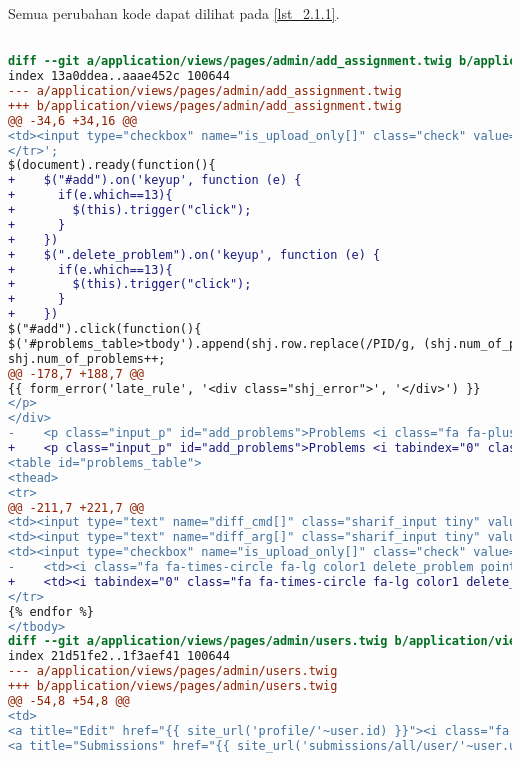 \begin{itemize}
	Semua perubahan kode dapat dilihat pada \ref{lst_2.1.1}.

\begin{lstlisting}[language=diff, caption=Perubahan untuk mematuhi kriteria 2.1.1, label=lst_2.1.1, basicstyle=\ttfamily, frame=single,
columns=fullflexible, keepspaces=true, breaklines=true]

diff --git a/application/views/pages/admin/add_assignment.twig b/application/views/pages/admin/add_assignment.twig
index 13a0ddea..aaae452c 100644
--- a/application/views/pages/admin/add_assignment.twig
+++ b/application/views/pages/admin/add_assignment.twig
@@ -34,6 +34,16 @@
<td><input type="checkbox" name="is_upload_only[]" class="check" value="PID"/><td><i class="fa fa-times-circle fa-lg color1 delete_problem pointer"></i></td></td>\
</tr>';
$(document).ready(function(){
+    $("#add").on('keyup', function (e) {
+      if(e.which==13){
+        $(this).trigger("click");
+      }
+    })
+    $(".delete_problem").on('keyup', function (e) {
+      if(e.which==13){
+        $(this).trigger("click");
+      }
+    })
$("#add").click(function(){
$('#problems_table>tbody').append(shj.row.replace(/PID/g, (shj.num_of_problems+1)));
shj.num_of_problems++;
@@ -178,7 +188,7 @@
{{ form_error('late_rule', '<div class="shj_error">', '</div>') }}
</p>
</div>
-    <p class="input_p" id="add_problems">Problems <i class="fa fa-plus-circle fa-lg color11 pointer" id="add"></i>
+    <p class="input_p" id="add_problems">Problems <i tabindex="0" class="fa fa-plus-circle fa-lg color11 pointer" id="add"></i>
<table id="problems_table">
<thead>
<tr>
@@ -211,7 +221,7 @@
<td><input type="text" name="diff_cmd[]" class="sharif_input tiny" value="{{ problem.diff_cmd }}"/></td>
<td><input type="text" name="diff_arg[]" class="sharif_input tiny" value="{{ problem.diff_arg }}"/></td>
<td><input type="checkbox" name="is_upload_only[]" class="check" value="{{ problem.id }}" {{ problem.is_upload_only ? 'checked' }}/></td>
-    <td><i class="fa fa-times-circle fa-lg color1 delete_problem pointer"></i></td>
+    <td><i tabindex="0" class="fa fa-times-circle fa-lg color1 delete_problem pointer"></i></td>
</tr>
{% endfor %}
</tbody>
diff --git a/application/views/pages/admin/users.twig b/application/views/pages/admin/users.twig
index 21d51fe2..1f3aef41 100644
--- a/application/views/pages/admin/users.twig
+++ b/application/views/pages/admin/users.twig
@@ -54,8 +54,8 @@
<td>
<a title="Edit" href="{{ site_url('profile/'~user.id) }}"><i class="fa fa-pencil fa-lg color9"></i></a>
<a title="Submissions" href="{{ site_url('submissions/all/user/'~user.username) }}"><i class="fa fa-bars fa-lg color12"></i></a>

\end{lstlisting}
\end{itemize}
